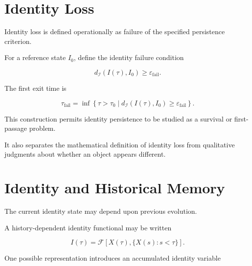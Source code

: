 \documentclass[12pt,oneside]{book}
\begin{document}
\section{Identity Loss}
\label{sec:identity-loss}

Identity loss is defined operationally as failure of the
specified persistence criterion.

For a reference state \(I_0\), define the identity failure
condition

\begin{equation}
    d_{\mathcal{I}}
    \left(
        I(\tau),
        I_0
    \right)
    \geq
    \varepsilon_{\mathrm{fail}}.
    \label{eq:identity-failure-condition}
\end{equation}

The first exit time is

\begin{equation}
    \tau_{\mathrm{fail}}
    =
    \inf
    \left\{
        \tau>\tau_0
        \mid
        d_{\mathcal{I}}
        \left(
            I(\tau),
            I_0
        \right)
        \geq
        \varepsilon_{\mathrm{fail}}
    \right\}.
    \label{eq:identity-failure-time}
\end{equation}

This construction permits identity persistence to be studied as
a survival or first-passage problem.

It also separates the mathematical definition of identity loss
from qualitative judgments about whether an object appears
different.


\section{Identity and Historical Memory}
\label{sec:identity-memory}

The current identity state may depend upon previous evolution.

A history-dependent identity functional may be written

\begin{equation}
    I(\tau)
    =
    \mathcal{F}
    \left[
        X(\tau),
        \{X(s):s<\tau\}
    \right].
    \label{eq:history-dependent-identity}
\end{equation}

One possible representation introduces an accumulated identity
variable
\end{document}
